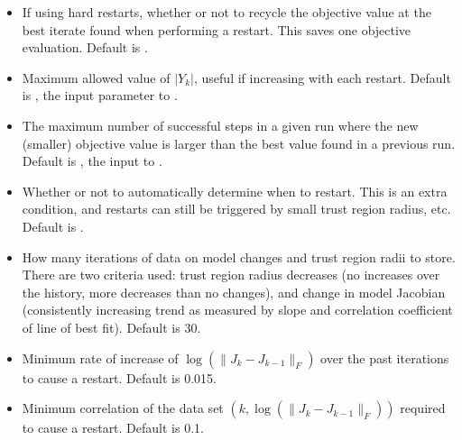\documentclass[letterpaper,10pt,english]{sphinxmanual}
\begin{document}
\begin{itemize}
\item {} 
 \sphinxhyphen{} If using hard restarts, whether or not to recycle the objective value at the best iterate found when performing a restart. This saves one objective evaluation. Default is .

\item {} 
 \sphinxhyphen{} Maximum allowed value of \(|Y_k|\), useful if increasing with each restart. Default is , the input parameter to .

\item {} 
 \sphinxhyphen{} The maximum number of successful steps in a given run where the new (smaller) objective value is larger than the best value found in a previous run. Default is , the input to .

\item {} 
 \sphinxhyphen{} Whether or not to automatically determine when to restart. This is an extra condition, and restarts can still be triggered by small trust region radius, etc. Default is .

\item {} 
 \sphinxhyphen{} How many iterations of data on model changes and trust region radii to store. There are two criteria used: trust region radius decreases (no increases over the history, more decreases than no changes), and change in model Jacobian (consistently increasing trend as measured by slope and correlation coefficient of line of best fit). Default is 30.

\item {} 
 \sphinxhyphen{} Minimum rate of increase of \(\log(\|J_k-J_{k-1}\|_F)\) over the past iterations to cause a restart. Default is 0.015.

\item {} 
 \sphinxhyphen{} Minimum correlation of the data set \((k, \log(\|J_k-J_{k-1}\|_F))\) required to cause a restart. Default is 0.1.

\end{itemize}
\end{document}
